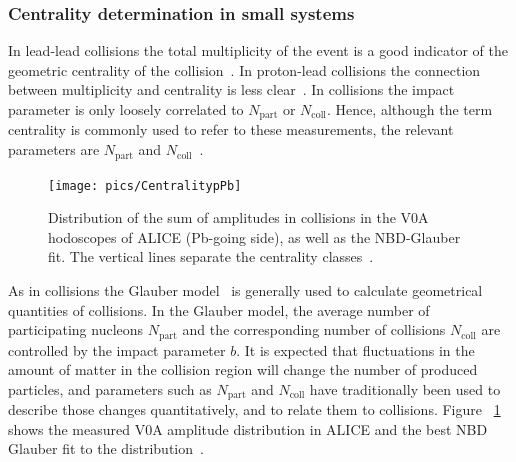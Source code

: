\FloatBarrier
\subsubsection{Centrality determination in small systems}
\label{sec:smallsystemcentrality}
In lead-lead collisions the total multiplicity of the event is a good indicator of the geometric centrality of the collision~\cite{Abelev:2013qoq}. In proton-lead collisions the connection between multiplicity and centrality is less clear~\cite{Adam:2014qja}. In \pPb collisions the impact parameter is only loosely correlated to $N_\mathrm{part}$ or $N_\mathrm{coll}$. Hence, although the term centrality is commonly used to refer to these measurements, the relevant parameters are $N_\mathrm{part}$ and $N_\mathrm{coll}$~\cite{Adam:2014qja}.

\begin{figure}[b!]
\centering
            	\texttt{[image: pics/CentralitypPb]}
                \caption{Distribution of the sum of amplitudes in \pPb collisions in the V0A hodoscopes of ALICE (Pb-going side), as well
as the NBD-Glauber fit. The vertical lines separate the centrality classes~\cite{Adam:2014qja}.}
	\label{fig:pPbcentrality}
\end{figure}




As in \PbPb collisions the Glauber model~\cite{Miller:2007ri} is generally used to calculate geometrical quantities of \pPb collisions. In the Glauber model, the average number of participating nucleons  $N_\mathrm{part}$ and the corresponding number of collisions $N_\mathrm{coll}$ are controlled by  the impact parameter $b$. It is expected that fluctuations in the amount of matter in the collision region will change the number of produced particles, and parameters such as $N_\mathrm{part}$ and $N_\mathrm{coll}$ have traditionally been used to describe those changes quantitatively, and to relate them to \pp collisions. Figure ~\ref{fig:pPbcentrality} shows the measured V0A amplitude distribution in ALICE and the best NBD Glauber fit to the distribution~\cite{Adam:2014qja}.




